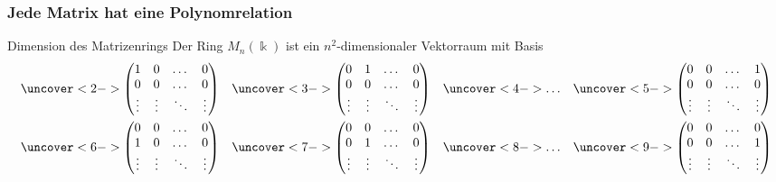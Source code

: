 %
%
%
\begin{frame}[t]
\frametitle{Jede Matrix hat eine Polynomrelation}
\setlength{\abovedisplayskip}{5pt}
\setlength{\belowdisplayskip}{5pt}
\vspace{-5pt}
\begin{block}{Dimension des Matrizenrings}
Der Ring $M_{n}(\Bbbk)$ ist ein $n^2$-dimensionaler Vektorraum mit
Basis
{\tiny
\begin{align*}
&\uncover<2->{\begin{pmatrix}
1&0&\dots&0\\
0&0&\dots&0\\
\vdots&\vdots&\ddots&\vdots\\
\end{pmatrix}}
&
&\uncover<3->{\begin{pmatrix}
0&1&\dots&0\\
0&0&\dots&0\\
\vdots&\vdots&\ddots&\vdots\\
\end{pmatrix}}
&
&\uncover<4->{\dots}
&
&\uncover<5->{\begin{pmatrix}
0&0&\dots&1\\
0&0&\dots&0\\
\vdots&\vdots&\ddots&\vdots\\
\end{pmatrix}}
\\
&\uncover<6->{\begin{pmatrix}
0&0&\dots&0\\
1&0&\dots&0\\
\vdots&\vdots&\ddots&\vdots\\
\end{pmatrix}}
&
&\uncover<7->{\begin{pmatrix}
0&0&\dots&0\\
0&1&\dots&0\\
\vdots&\vdots&\ddots&\vdots\\
\end{pmatrix}}
&
&\uncover<8->{\dots}
&
&\uncover<9->{\begin{pmatrix}
0&0&\dots&0\\
0&0&\dots&1\\
\vdots&\vdots&\ddots&\vdots\\
\end{pmatrix}}
\end{align*}}
\end{block}
\vspace{-10pt}
\end{frame}
